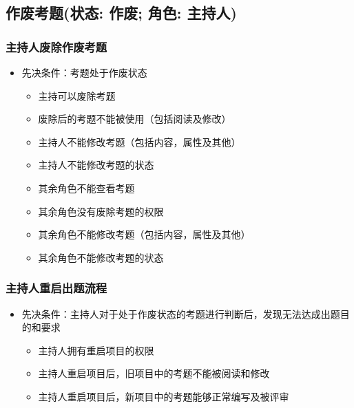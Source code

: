 \documentclass[hyperref, a4paper]{ctexart}
\providecommand{\tightlist}{%
  \setlength{\itemsep}{0pt}\setlength{\parskip}{0pt}}
\begin{document}
\hypertarget{ux4f5cux5e9fux8003ux9898ux72b6ux6001-ux4f5cux5e9f-ux89d2ux8272-ux4e3bux6301ux4eba}{%
\subsection{作废考题(状态: 作废; 角色:
主持人)}\label{ux4f5cux5e9fux8003ux9898ux72b6ux6001-ux4f5cux5e9f-ux89d2ux8272-ux4e3bux6301ux4eba}}

\hypertarget{ux4e3bux6301ux4ebaux5e9fux9664ux4f5cux5e9fux8003ux9898}{%
\subsubsection{主持人废除作废考题}\label{ux4e3bux6301ux4ebaux5e9fux9664ux4f5cux5e9fux8003ux9898}}

\begin{itemize}
\tightlist
\item
  先决条件：考题处于作废状态

  \begin{itemize}
  \tightlist
  \item
    主持可以废除考题
  \item
    废除后的考题不能被使用（包括阅读及修改）
  \item
    主持人不能修改考题（包括内容，属性及其他）
  \item
    主持人不能修改考题的状态
  \item
    其余角色不能查看考题
  \item
    其余角色没有废除考题的权限
  \item
    其余角色不能修改考题（包括内容，属性及其他）
  \item
    其余角色不能修改考题的状态
  \end{itemize}
\end{itemize}

\hypertarget{ux4e3bux6301ux4ebaux91cdux542fux51faux9898ux6d41ux7a0b}{%
\subsubsection{主持人重启出题流程}\label{ux4e3bux6301ux4ebaux91cdux542fux51faux9898ux6d41ux7a0b}}

\begin{itemize}
\tightlist
\item
  先决条件：主持人对于处于作废状态的考题进行判断后，发现无法达成出题目的和要求

  \begin{itemize}
  \tightlist
  \item
    主持人拥有重启项目的权限
  \item
    主持人重启项目后，旧项目中的考题不能被阅读和修改
  \item
    主持人重启项目后，新项目中的考题能够正常编写及被评审
  \end{itemize}
\end{itemize}
\end{document}
